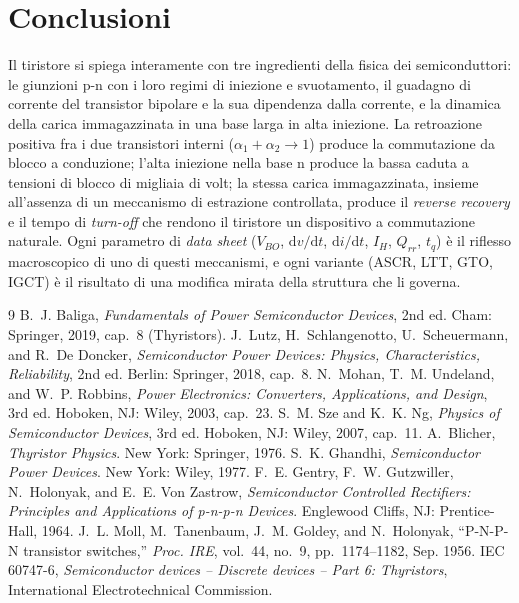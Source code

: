 \documentclass[11pt,a4paper]{article}
\newcommand{\IH}{\ensuremath{I_H}}
\newcommand{\VBO}{\ensuremath{V_{BO}}}
\newcommand{\tq}{\ensuremath{t_q}}
\newcommand{\dvdt}{\ensuremath{\mathrm{d}v/\mathrm{d}t}}
\newcommand{\didt}{\ensuremath{\mathrm{d}i/\mathrm{d}t}}
\newcommand{\en}[1]{\emph{#1}}   %
\begin{document}
\section{Conclusioni}
Il tiristore si spiega interamente con tre ingredienti della fisica dei semiconduttori: le giunzioni p-n con i loro regimi di iniezione e svuotamento, il guadagno di corrente del transistor bipolare e la sua dipendenza dalla corrente, e la dinamica della carica immagazzinata in una base larga in alta iniezione. La retroazione positiva fra i due transistori interni ($\alpha_1+\alpha_2\to1$) produce la commutazione da blocco a conduzione; l'alta iniezione nella base n produce la bassa caduta a tensioni di blocco di migliaia di volt; la stessa carica immagazzinata, insieme all'assenza di un meccanismo di estrazione controllata, produce il \en{reverse recovery} e il tempo di \en{turn-off} che rendono il tiristore un dispositivo a commutazione naturale. Ogni parametro di \en{data sheet} ($\VBO$, $\dvdt$, $\didt$, $\IH$, $Q_{rr}$, $\tq$) è il riflesso macroscopico di uno di questi meccanismi, e ogni variante (ASCR, LTT, GTO, IGCT) è il risultato di una modifica mirata della struttura che li governa.

\begin{thebibliography}{9}
 B.~J. Baliga, \emph{Fundamentals of Power Semiconductor Devices}, 2nd ed. Cham: Springer, 2019, cap.~8 (Thyristors).
 J.~Lutz, H.~Schlangenotto, U.~Scheuermann, and R.~De Doncker, \emph{Semiconductor Power Devices: Physics, Characteristics, Reliability}, 2nd ed. Berlin: Springer, 2018, cap.~8.
 N.~Mohan, T.~M. Undeland, and W.~P. Robbins, \emph{Power Electronics: Converters, Applications, and Design}, 3rd ed. Hoboken, NJ: Wiley, 2003, cap.~23.
 S.~M. Sze and K.~K. Ng, \emph{Physics of Semiconductor Devices}, 3rd ed. Hoboken, NJ: Wiley, 2007, cap.~11.
 A.~Blicher, \emph{Thyristor Physics}. New York: Springer, 1976.
 S.~K. Ghandhi, \emph{Semiconductor Power Devices}. New York: Wiley, 1977.
 F.~E. Gentry, F.~W. Gutzwiller, N.~Holonyak, and E.~E. Von Zastrow, \emph{Semiconductor Controlled Rectifiers: Principles and Applications of p-n-p-n Devices}. Englewood Cliffs, NJ: Prentice-Hall, 1964.
 J.~L. Moll, M.~Tanenbaum, J.~M. Goldey, and N.~Holonyak, ``P-N-P-N transistor switches,'' \emph{Proc. IRE}, vol.~44, no.~9, pp.~1174--1182, Sep. 1956.
 IEC 60747-6, \emph{Semiconductor devices -- Discrete devices -- Part 6: Thyristors}, International Electrotechnical Commission.
\end{thebibliography}
\end{document}
